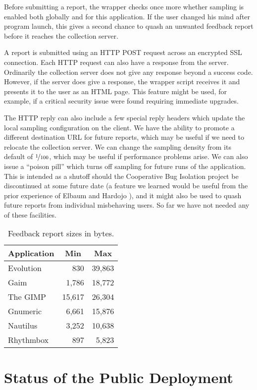\documentclass[10pt,twocolumn]{article}
\newcommand{\evolution}{Evolution\xspace}
\newcommand{\gaim}{Gaim\xspace}
\newcommand{\gimp}{The GIMP\xspace}
\newcommand{\gnumeric}{Gnumeric\xspace}
\newcommand{\nautilus}{Nautilus\xspace}
\newcommand{\rhythmbox}{Rhythmbox\xspace}
\newcommand{\header}[1]{\multicolumn{1}{c}{\textbf{#1}}}
\begin{document}
Before submitting a report, the wrapper checks once more whether
sampling is enabled both globally and for this application.  If the
user changed his mind after program launch, this gives a second chance
to quash an unwanted feedback report before it reaches the collection
server.

A report is submitted using an HTTP POST request across an encrypted SSL
connection.  Each HTTP request can also have a response from the server.
Ordinarily the collection server does not give any response beyond a
success code.  However, if the server does give a response, the
wrapper script receives it and presents it to the user as an HTML
page.  This feature might be used, for example, if a critical security
issue were found requiring immediate upgrades.  

The HTTP reply can also include a few special reply headers which
update the local sampling configuration on the client.  We have the
ability to promote a different destination URL for future reports,
which may be useful if we need to relocate the collection server.  We
can change the sampling density from its default of $\nicefrac{1}{100}$, which may be
useful if performance problems arise.  We can also issue a ``poison
pill'' which turns off sampling for future runs of the application.
This is intended as a shutoff should the Cooperative Bug
Isolation project be discontinued at some future date (a feature we
learned would be useful from the prior experience of Elbaum and
Hardojo \cite{Elbaum:2003:DISATA}), and it might also
be used to quash future reports from individual misbehaving users.  So
far we have not needed any of these facilities.  

\begin{table}
  \centering
  \begin{tabular}{lrr}
    \header{Application} & \header{Min} & \header{Max} \\ \hline
    \evolution & 830 & 39,863  \\
    \gaim & 1,786 & 18,772  \\
    \gimp & 15,617 & 26,304  \\
    \gnumeric & 6,661 & 15,876  \\
    \nautilus & 3,252 & 10,638  \\
    \rhythmbox & 897 & 5,823 
  \end{tabular}
  \caption{Feedback report sizes in bytes.}
  \label{report-sizes}
\end{table}

\section{Status of the Public Deployment}
\end{document}
